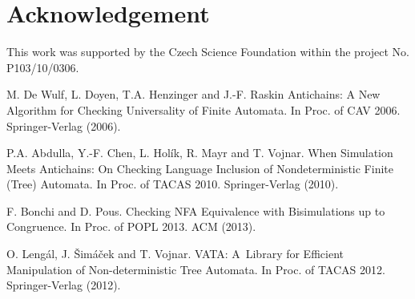 \documentclass{eeict}
\begin{document}
\begin{comment}
\subsection{Bisimulation up to congruence}
The another approach to checking inclusion over NFA is based on bisimulation up to congruence. This approach is primary for checking language equivalence but it can
also be used for checking language inclusion, when you consider that $L(A)\cup L(B)= L(B) \Rightarrow L(A)\subseteq L(B)$. 
The congruence algorithm is based on similar principle as antichain algorithm. 
It starts determinization of $A$ and $B$ simultaneously and checks, if newly generated states are equivalent (if they are either
finale or not). Optimization is based on computing congruence closure on the set of generated pair of states. 
If the newly generate pair is in this congruence
closure, it could be skipped. 
\end{comment}



%
\section*{Acknowledgement}
This work was supported by the Czech Science Foundation within the project No. P103/10/0306.
%
\begin{thebibliography}{9}
   M. De Wulf, L. Doyen, T.A. Henzinger and J.-F. Raskin  Antichains: A
		New Algorithm for Checking Universality of Finite Automata. In Proc. of CAV 2006. Springer-Verlag (2006).

   P.A. Abdulla, Y.-F. Chen, L. Holík, R. Mayr and
		T. Vojnar. When Simulation Meets Antichains: On Checking Language Inclusion of
		Nondeterministic Finite (Tree) Automata. In Proc. of TACAS 2010. Springer-Verlag (2010).

	 F. Bonchi and D. Pous. Checking NFA Equivalence with Bisimulations up
		to Congruence. In Proc. of POPL 2013. ACM (2013).
	
	 O. Lengál, J. Šimáček and T. Vojnar. VATA: A~Library for Efficient
		Manipulation of Non-deterministic Tree Automata. In Proc. of TACAS 2012. Springer-Verlag (2012).

  

\end{thebibliography}
\end{document}
